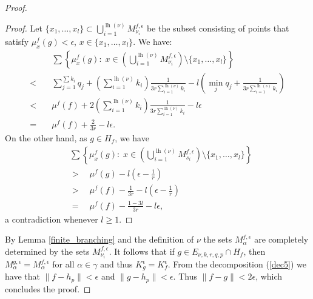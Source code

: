\documentclass[11pt]{article}
\DeclareMathOperator{\lgth}{lh}
\theoremstyle{definition}
\theoremstyle{remark}
\begin{document}
\begin{proof}
\begin{proof}
		Let $\{x_1, \dots, x_l\} \subset \bigcup\limits_{i = 1}^{\lgth(\nu)} M^{f,\epsilon}_{\nu_i}$ be the subset consisting of points that satisfy $\mu^f_{x} (g) < \epsilon$, $x \in \{x_1, \dots, x_l\}$. We have:
		\begin{align*}
			&\sum \left\{\mu^f_x (g): \; x \in \left(\bigcup_{i = 1}^{\lgth(\nu)} M^{f, \epsilon}_{\nu_i}\right) \setminus \{x_1, \dots, x_l\}\right\} \\
			< \quad &\sum_{j = 1}^{\sum k_i} q_j + \left(\sum_{i = 1}^{\lgth(\nu)} k_i\right) \frac{1}{3 r \sum_{i = 1}^{\lgth(\nu)} k_i} - l\left(\min_j q_j + \frac{1}{3 r \sum_{i = 1}^{\lgth(s)} k_i}\right) \\
			< \quad& \mu^f (f) + 2 \left(\sum_{i = 1}^{\lgth(\nu)} k_i\right) \frac{1}{3 r \sum_{i = 1}^{\lgth(\nu)} k_i} - l\epsilon \\
			= \quad&\mu^f (f) + \frac{2}{3r} - l \epsilon.
		\end{align*}
		On the other hand, as $g \in H_f$, we have
		\begin{align*}
			&\sum \left\{\mu^f_x (g): \; x \in \left(\bigcup_{i = 1}^{\lgth(\nu)} M^{f, \epsilon}_{s_i}\right) \setminus \{x_1, \dots, x_l\}\right\} \\
			&> \quad \mu^f (g) - l \left(\epsilon - \frac{1}{r}\right) \\
			&> \quad \mu^f (f) - \frac{1}{3r} - l \left(\epsilon - \frac{1}{r}\right) \\
			&= \quad \mu^f (f) - \frac{1 - 3l}{3r} - l\epsilon,
		\end{align*}
		a contradiction whenever $l \geq 1$.
	\end{proof}
	
	By Lemma \ref{finite_branching} and the definition of $\nu$ the sets $M^{f, \epsilon}_\alpha$ are completely determined by the sets $M^{f, \epsilon}_{\nu_i}$. It follows that if $g \in E_{\nu,k,r,q,p} \cap H_f$, then $M^{g, \epsilon}_\alpha = M^{f, \epsilon}_\alpha$ for all $\alpha \in \gamma$ and thus $K^\epsilon_g = K^\epsilon_f$. From the decomposition (\ref{dec5}) we have that $\|f - h_p\| < \epsilon$ and $\|g - h_p\| < \epsilon$. Thus $\|f-g\| < 2 \epsilon$, which concludes the proof.
\end{proof}
\end{document}
